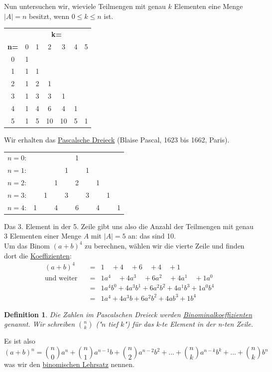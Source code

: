 \documentclass{report}
\newtheorem{mydef}{Definition}
\begin{document}
Nun untersuchen wir, wieviele Teilmengen mit genau $k$ Elementen eine Menge $|A| = n$ besitzt, wenn $0 \leq k \leq n$ ist.
\begin{center}
\begin{tabular}{c|c|c|c|c|c|c|}
& \multicolumn{6}{|c|}{\bf k=} \\
{\bf n=}& 0 & 1 & 2 & 3 & 4 &5 \\ \hline
0 & 1 & & & & & \\ \hline
1 & 1 & 1 & & & & \\ \hline
2 & 1 & 2 & 1 & & & \\ \hline
3 & 1 & 3 & 3 & 1 & & \\ \hline
4 & 1 & 4 & 6 & 4 & 1 & \\ \hline
5 & 1 & 5 & 10 & 10 & 5 & 1\\ \hline\end{tabular}
\end{center}Wir erhalten das \underline{Pascalsche Dreieck} (Blaise Pascal, 1623 bis 1662, Paris).
\begin{center}
\begin{tabular}{rccccccccc}
$n=0$: & & & & & 1 & & & & \\
$n=1$: & & & & 1 & & 1 & & & \\
$n=2$: & & & 1 & & 2 & & 1 & & \\
$n=3$: & & 1 & & 3 & & 3 & & 1 & \\
$n=4$: & 1 & & 4 & & 6 & & 4 & & 1%
\end{tabular}
\end{center}
Das 3. Element in der 5. Zeile gibt uns also die Anzahl der Teilmengen mit genau 3 Elementen einer Menge $A$ mit $|A| = 5$ an: das sind 10.\\
Um das Binom $(a+b)^4$ zu berechnen, wählen wir die vierte Zeile und finden dort die \underline{Koeffizienten}:
\begin{eqnarray}(a+b)^4 & = & 1\quad +4 \quad +6 \quad +4 \quad +1 \\ \nonumber
\mbox{und weiter} \quad & = & 1a^4 \quad +4a^3 \quad +6a^2 \quad +4a^1 \quad +1a^0 \\ \nonumber
& = & 1a^4b^0 + 4a^3b^1 + 6a^2b^2 + 4a^1b^3 + 1a^0b^4 \\ \nonumber
& = & 1a^4 + 4a^3b + 6a^2b^2 + 4ab^3 + 1b^4\end{eqnarray}

\begin{mydef}Die Zahlen im Pascalschen Dreieck werden \underline{Binominalkoeffizienten} genannt. Wir schreiben $\binom{n}{k}$ ("$n$ tief $k$") für das k-te Element in der n-ten Zeile.\end{mydef}
Es ist also
\begin{equation}(a+b)^n = \binom{n}{0}a^n + \binom{n}{1}a^{n-1}b + \binom{n}{2}a^{n-2}b^2 + ... + \binom{n}{k}a^{n-k}b^k + ... + \binom{n}{k}b^n\end{equation}
was wir den \underline{binomischen Lehrsatz} nennen.
\end{document}
